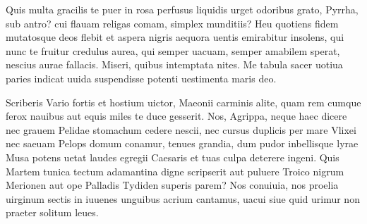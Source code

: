 \documentclass{book}
\newenvironment {carmen} [1] [\relax] 
  {\Titulus \Versus \incipit*\numerus{1}#1}
  {\endVersus}
\newcommand {\AsclA}     {\Forma \strophae {0 \poena 00 \poena 2}}
\newcommand {\AsclB}     {\Forma \strophae {0 \poena 02 \poena 3}}
\begin{document}
\begin{carmen}[\AsclB]


 Quis multa gracilis te puer in rosa
 perfusus liquidis urget odoribus
      grato, Pyrrha, sub antro?
      cui flauam religas comam,
 simplex munditiis? Heu quotiens fidem               
 mutatosque deos flebit et aspera
      nigris aequora uentis
      emirabitur insolens,
 qui nunc te fruitur credulus aurea,
 qui semper uacuam, semper amabilem               
      sperat, nescius aurae
      fallacis. Miseri, quibus
 intemptata nites. Me tabula sacer
 uotiua paries indicat uuida
       suspendisse potenti
      uestimenta maris deo.                

\end{carmen}

\begin{carmen}[\AsclA]

 Scriberis Vario fortis et hostium
 uictor, Maeonii carminis alite,
 quam rem cumque ferox nauibus aut equis
 miles te duce gesserit.
 Nos, Agrippa, neque haec dicere nec grauem               
 Pelidae stomachum cedere nescii,
 nec cursus duplicis per mare Vlixei
      nec saeuam Pelops domum
 conamur, tenues grandia, dum pudor
 inbellisque lyrae Musa potens uetat               
 laudes egregii Caesaris et tuas
      culpa deterere ingeni.
 Quis Martem tunica tectum adamantina
 digne scripserit aut puluere Troico
 nigrum Merionen aut ope Palladis               
      Tydiden superis parem?
 Nos conuiuia, nos proelia uirginum
 sectis in iuuenes unguibus acrium
 cantamus, uacui siue quid urimur
       non praeter solitum leues.                

\end{carmen}
\end{document}
